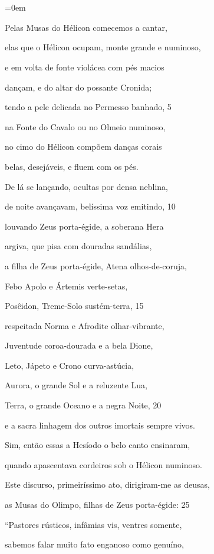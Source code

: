 \chapter*{}

\begingroup\parindent=0em

Pelas Musas do Hélicon comecemos a cantar,

elas que o Hélicon ocupam, monte grande e numinoso,

e em volta de fonte violácea com pés macios

dançam, e do altar do possante Cronida;

tendo a pele delicada no Permesso banhado, \num{5}

na Fonte do Cavalo ou no Olmeio numinoso,

no cimo do Hélicon compõem danças corais

belas, desejáveis, e fluem com os pés.

\quad{}De lá se lançando, ocultas por densa neblina,

de noite avançavam, belíssima voz emitindo, \num{10}

louvando Zeus porta-égide, a soberana Hera

argiva, que pisa com douradas sandálias,

a filha de Zeus porta-égide, Atena olhos-de-coruja,

Febo Apolo e Ártemis verte-setas,

Posêidon, Treme-Solo sustém-terra, \num{15}

respeitada Norma e Afrodite olhar-vibrante,

Juventude coroa-dourada e a bela Dione,

Leto, Jápeto e Crono curva-astúcia,

Aurora, o grande Sol e a reluzente Lua,

Terra, o grande Oceano e a negra Noite, \num{20}

e a sacra linhagem dos outros imortais sempre vivos.

\quad{}Sim, então essas a Hesíodo o belo canto ensinaram,

quando apascentava cordeiros sob o Hélicon numinoso.

Este discurso, primeiríssimo ato, dirigiram-me as deusas,

as Musas do Olimpo, filhas de Zeus porta-égide: \num{25}

``Pastores rústicos, infâmias vis, ventres somente,

sabemos falar muito fato enganoso como genuíno,

